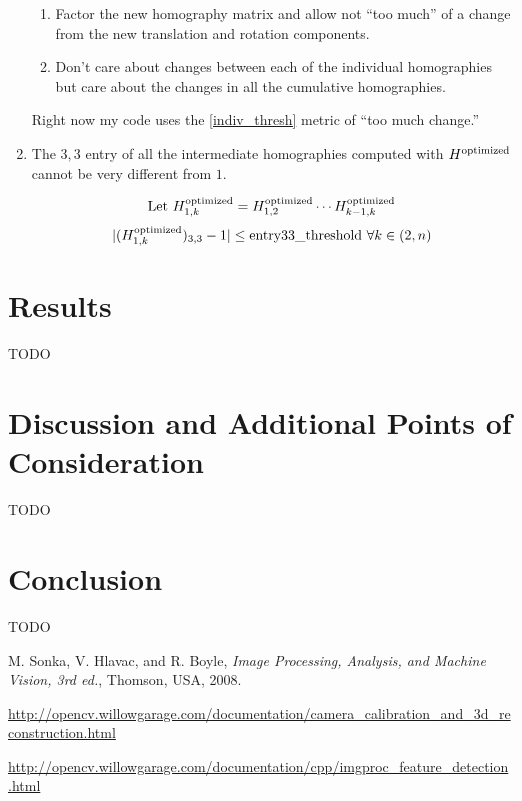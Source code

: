 \documentclass{article}
\begin{document}
\begin{enumerate}
\begin{enumerate}
\item Factor the new homography matrix and allow not ``too much'' of a change
from the new translation and rotation components.   

\item Don't care about changes between each of the individual homographies but
care about the changes in all the cumulative homographies. 

\end{enumerate} 

Right now my code uses the \ref{indiv_thresh} metric of ``too much change.''

\item The $3, 3$ entry of all the intermediate homographies computed with
$H^{\textnormal{optimized}}$ cannot be very different from $1$.

\[\textnormal{Let } H_{1, k}^{\textnormal{optimized}} = H_{1, 2}^{\textnormal{optimized}} \cdots H_{k - 1, k}^{\textnormal{optimized}}\]
\[|(H_{1, k}^{\textnormal{optimized}})_{3, 3} - 1| \leq \textnormal{entry33\_threshold } \forall k \in (2, n)\]

\end{enumerate}

\section{Results}

TODO

\section{Discussion and Additional Points of Consideration}

TODO

\section{Conclusion}

TODO

\begin{thebibliography}{1}

 M. Sonka, V. Hlavac, and R. Boyle, \emph{Image Processing, Analysis, and Machine Vision, 3rd ed.}, Thomson, USA, 2008.

 \url{http://opencv.willowgarage.com/documentation/camera_calibration_and_3d_reconstruction.html}

 \url{http://opencv.willowgarage.com/documentation/cpp/imgproc_feature_detection.html}

\end{thebibliography}
\end{document}
